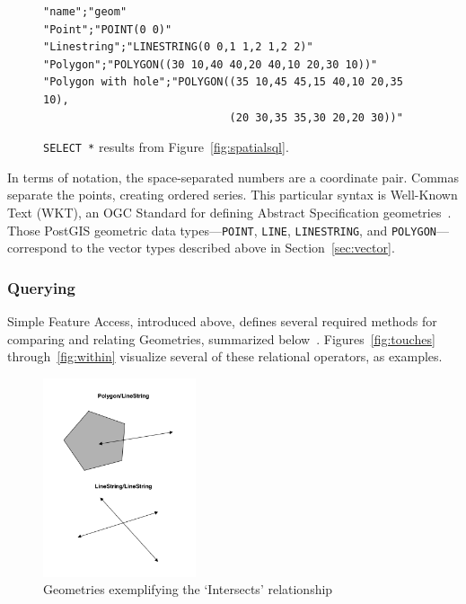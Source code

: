 \begin{figure}
\begin{Verbatim}[samepage=true,baselinestretch=1,xleftmargin=12mm]
"name";"geom"
"Point";"POINT(0 0)"
"Linestring";"LINESTRING(0 0,1 1,2 1,2 2)"
"Polygon";"POLYGON((30 10,40 40,20 40,10 20,30 10))"
"Polygon with hole";"POLYGON((35 10,45 45,15 40,10 20,35 10),
                             (20 30,35 35,30 20,20 30))"
\end{Verbatim}
\vspace{-20pt}
\caption{\texttt{SELECT *} results from Figure~\ref{fig:spatialsql}.}
\label{fig:sqlresult}
\end{figure}


In terms of notation, the space-separated numbers are a coordinate pair. Commas separate the points, creating ordered series. This particular syntax is Well-Known Text (WKT), an OGC Standard for defining Abstract Specification geometries~\cite{ogc}. Those PostGIS geometric data types---\texttt{POINT}, \texttt{LINE}, \texttt{LINESTRING}, and \texttt{POLYGON}---correspond to the vector types described above in Section~\ref{sec:vector}.

\subsubsection{Querying}
Simple Feature Access, introduced above, defines several required methods for comparing and relating Geometries, summarized below~\cite{SFA}. Figures~\ref{fig:touches} through~\ref{fig:within} visualize several of these relational operators, as examples.

\begin{figure}
    \centering

    \includegraphics[width=0.4\textwidth]{figures/crosses.png}
    
    \caption{Geometries exemplifying the `Intersects' relationship}
    \label{fig:intersects}
    
\end{figure}


